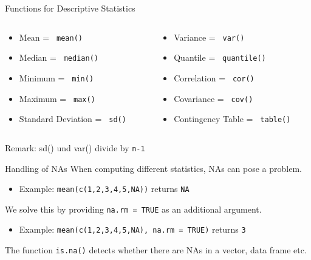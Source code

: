 \documentclass[aspectratio = 169]{chariteBeamer}
\begin{document}
\begin{frame}[fragile]{Functions for Descriptive Statistics}
\begin{columns}[T]
	\begin{column}{0.5\textwidth}
		\begin{itemize}
			\item Mean = \verb+ mean() +
			\item Median = \verb+ median() +
			\item Minimum = \verb+ min() +
			\item Maximum = \verb+ max() +
			\item Standard Deviation = \verb+ sd() +
		\end{itemize}
	\end{column}
	\begin{column}{0.5\textwidth}
		\begin{itemize}
			\item Variance = \verb+ var() +
			\item Quantile = \verb+ quantile() +
			\item Correlation = \verb+ cor() +
			\item Covariance = \verb+ cov() +
			\item Contingency Table = \verb+ table() +
		\end{itemize}
	\end{column}
\end{columns}
Remark: sd() und var() divide by \verb+n-1+
\end{frame}

\begin{frame}[fragile]{Handling of NAs}
	When computing different statistics, NAs can pose a problem.\\
	\begin{itemize}
			\item Example: \verb+mean(c(1,2,3,4,5,NA))+ returns \verb+NA+\\
	\end{itemize}
	We solve this by providing \verb+na.rm = TRUE+ as an additional argument.\\
	\begin{itemize}
			\item Example: \verb+mean(c(1,2,3,4,5,NA), na.rm = TRUE)+ returns \verb+3+
	\end{itemize}
	The function \verb+is.na()+ detects whether there are NAs in a vector, data frame etc.
\end{frame}

\end{document}

